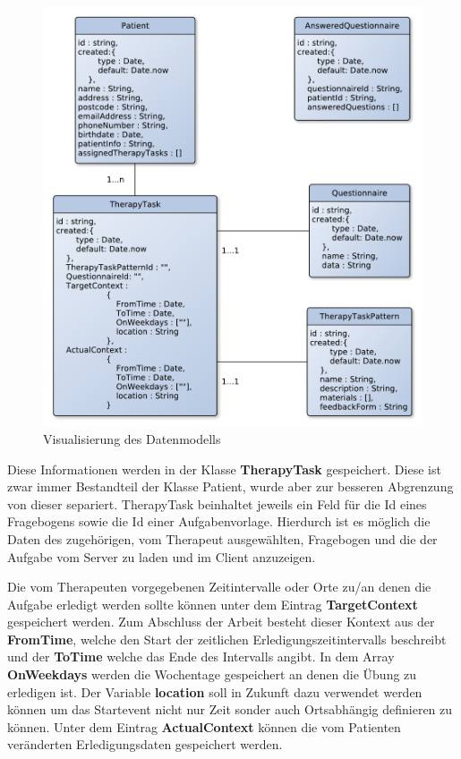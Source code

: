 \begin{figure}[H]
	\centering
	\includegraphics[scale=0.6]{images/datenModell}
	\caption[Visualisierung des Datenmodells]{Visualisierung des Datenmodells}
	\label{Datenmodell}
\end{figure}

Diese Informationen werden in der Klasse \textbf{TherapyTask} gespeichert. Diese ist zwar immer Bestandteil der Klasse Patient, wurde aber zur besseren Abgrenzung von dieser separiert.
TherapyTask beinhaltet jeweils ein Feld für die Id eines Fragebogens sowie die Id einer Aufgabenvorlage. Hierdurch ist es möglich die Daten des zugehörigen, vom Therapeut ausgewählten, Fragebogen und die der Aufgabe vom Server zu laden und im Client anzuzeigen.

Die vom Therapeuten vorgegebenen Zeitintervalle oder Orte zu/an denen die Aufgabe erledigt werden sollte können unter dem Eintrag \textbf{TargetContext} gespeichert werden. Zum Abschluss der Arbeit besteht dieser Kontext aus der \textbf{FromTime}, welche den Start der zeitlichen Erledigungszeitintervalls beschreibt und der \textbf{ToTime} welche das Ende des Intervalls angibt. In dem Array \textbf{OnWeekdays} werden die Wochentage gespeichert an denen die Übung zu erledigen ist. Der Variable \textbf{location} soll in Zukunft dazu verwendet werden können um das Startevent nicht nur Zeit sonder auch Ortsabhängig definieren zu können.
Unter dem Eintrag \textbf{ActualContext} können die vom Patienten veränderten Erledigungsdaten gespeichert werden.

